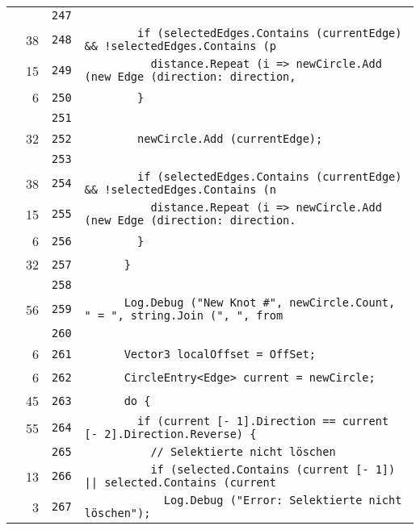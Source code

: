 \documentclass[a4paper,10pt]{article}
\begin{document}
\begin{longtable}[l]{lrrl}
\cellcolor{gray} &  & \verb~247~ & \verb~~\\
\cellcolor{green} & 38 & \verb~248~ & \verb~        if (selectedEdges.Contains (currentEdge) && !selectedEdges.Contains (p~\\
\cellcolor{green} & 15 & \verb~249~ & \verb~          distance.Repeat (i => newCircle.Add (new Edge (direction: direction,~\\
\cellcolor{green} & 6 & \verb~250~ & \verb~        }~\\
\cellcolor{gray} &  & \verb~251~ & \verb~~\\
\cellcolor{green} & 32 & \verb~252~ & \verb~        newCircle.Add (currentEdge);~\\
\cellcolor{gray} &  & \verb~253~ & \verb~~\\
\cellcolor{green} & 38 & \verb~254~ & \verb~        if (selectedEdges.Contains (currentEdge) && !selectedEdges.Contains (n~\\
\cellcolor{green} & 15 & \verb~255~ & \verb~          distance.Repeat (i => newCircle.Add (new Edge (direction: direction.~\\
\cellcolor{green} & 6 & \verb~256~ & \verb~        }~\\
\cellcolor{green} & 32 & \verb~257~ & \verb~      }~\\
\cellcolor{gray} &  & \verb~258~ & \verb~~\\
\cellcolor{green} & 56 & \verb~259~ & \verb~      Log.Debug ("New Knot #", newCircle.Count, " = ", string.Join (", ", from~\\
\cellcolor{gray} &  & \verb~260~ & \verb~~\\
\cellcolor{green} & 6 & \verb~261~ & \verb~      Vector3 localOffset = OffSet;~\\
\cellcolor{green} & 6 & \verb~262~ & \verb~      CircleEntry<Edge> current = newCircle;~\\
\cellcolor{green} & 45 & \verb~263~ & \verb~      do {~\\
\cellcolor{green} & 55 & \verb~264~ & \verb~        if (current [- 1].Direction == current [- 2].Direction.Reverse) {~\\
\cellcolor{gray} &  & \verb~265~ & \verb~          // Selektierte nicht löschen~\\
\cellcolor{green} & 13 & \verb~266~ & \verb~          if (selected.Contains (current [- 1]) || selected.Contains (current ~\\
\cellcolor{green} & 3 & \verb~267~ & \verb~            Log.Debug ("Error: Selektierte nicht löschen");~\\

\end{longtable}
\end{document}
